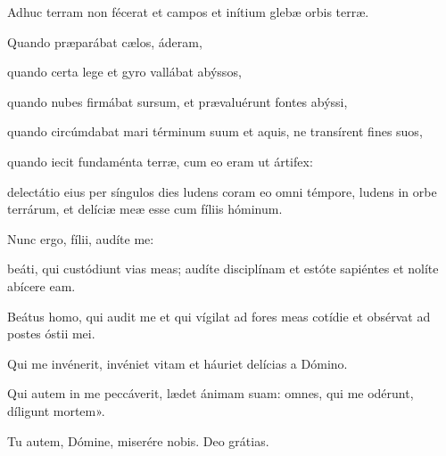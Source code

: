 {\noindent Adhuc terram non fécerat et campos et inítium glebæ orbis terræ.

\noindent Quando præparábat cælos, áderam,

\noindent quando certa lege et gyro vallábat abýssos,

\noindent quando nubes firmábat sursum, et prævaluérunt fontes abýssi,

\noindent quando circúmdabat mari términum suum et aquis, ne transírent fines suos,

\noindent quando iecit fundaménta terræ, cum eo eram ut ártifex:

\noindent delectátio eius per síngulos dies ludens coram eo omni témpore, ludens in orbe terrárum, et delíciæ meæ esse cum fíliis hóminum.

\noindent Nunc ergo, fílii, audíte me:

\noindent beáti, qui custódiunt vias meas; audíte disciplínam et estóte sapiéntes et nolíte abícere eam.

\noindent Beátus homo, qui audit me et qui vígilat ad fores meas cotídie et obsérvat ad postes óstii mei.

\noindent Qui me invénerit, invéniet vitam et háuriet delícias a Dómino.

\noindent Qui autem in me peccáverit, lædet ánimam suam: omnes, qui me odérunt, díligunt mortem».

\noindent \Vbardot{} Tu autem, Dómine, miserére nobis.
\noindent \Rbardot{} Deo grátias.}
\newcommand{\responsoriumi}{\pars{Responsorium 1.} \scriptura{\Rbardot{} Prv. 8, 23-25 \Vbardot{} ibid. 8, 26.30; \textbf{H398}}

\vspace{-5mm}

\responsorium{I}{temporalia/resp-inprincipiodeusantequam-CROCHU.gtex}{}

\rubrica{vel ad libitum:}

\vspace{3mm}

\pars{Responsorium 1.} \scriptura{\Rbardot{} Eccli. 24, 8-11 \Vbardot{} ibid. 24, 7; \textbf{H399}}

\vspace{-5mm}

\responsorium{VI}{temporalia/resp-gyrumcaeli-CROCHU.gtex}{}}
